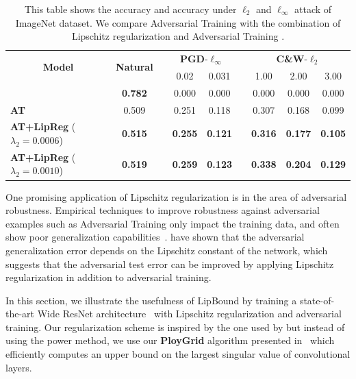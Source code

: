 \begin{table}[ht]
  \centering
  {\small
  \begin{tabular}{lcccccccc}
    \toprule
    \multicolumn{1}{c}{\multirow{2}[4]{*}{\textbf{Model}}} & \multicolumn{1}{c}{\multirow{2}[4]{*}{\textbf{Natural}}} &  
    & \multicolumn{2}{c}{\textbf{PGD}-$\ell_\infty$} &   & \multicolumn{3}{c}{\textbf{C\&W}-$\ell_2$} \\
    \cmidrule{4-5}\cmidrule{7-9} 
    &  &  & \multicolumn{1}{c}{0.02} & \multicolumn{1}{c}{0.031} &   & \multicolumn{1}{c}{1.00} & \multicolumn{1}{c}{2.00} & \multicolumn{1}{c}{3.00} \\
    \midrule
    \citeauthor{he2016deep} & \textbf{0.782} & & 0.000 & 0.000 & & 0.000 & 0.000 & 0.000 \\
    \textbf{AT} & 0.509 &   & 0.251 & 0.118 &   & 0.307 & 0.168 & 0.099 \\
    \textbf{AT+LipReg} ($\lambda_2 = 0.0006$) & \textbf{0.515} &   & \textbf{0.255} & \textbf{0.121} &   & \textbf{0.316} & \textbf{0.177} & \textbf{0.105} \\
    \textbf{AT+LipReg} ($\lambda_2 = 0.0010$) & \textbf{0.519} &   & \textbf{0.259} & \textbf{0.123} &   & \textbf{0.338} & \textbf{0.204} & \textbf{0.129} \\
    \bottomrule
  \end{tabular}%
  }
  \caption{This table shows the accuracy and accuracy under $\ell_2$ and $\ell_\infty$ attack of ImageNet dataset. We compare Adversarial Training with the combination of Lipschitz regularization and Adversarial Training \cite{madry2018towards}. }
    \label{table:ch5-results_imagenet_dataset}
\end{table}%


One promising application of Lipschitz regularization is in the area of adversarial robustness.
Empirical techniques to improve robustness against adversarial examples such as Adversarial Training only impact the training data,  and often show poor generalization capabilities~\cite{schmidt2018adversarially}.
\citet{farnia2018generalizable} have shown that the adversarial generalization error depends on the Lipschitz constant of the network, which suggests that the adversarial test error can be improved by applying Lipschitz regularization in addition to adversarial training.

In this section, we illustrate the usefulness of LipBound by training a state-of-the-art Wide ResNet architecture~\citep{zagoruyko2016wide} with Lipschitz regularization and adversarial training.
Our regularization scheme is inspired by the one used by \citet{yoshida2017spectral} but instead of using the power method, we use our \textbf{PloyGrid} algorithm presented in~ which efficiently computes an upper bound on the largest singular value of convolutional layers.

